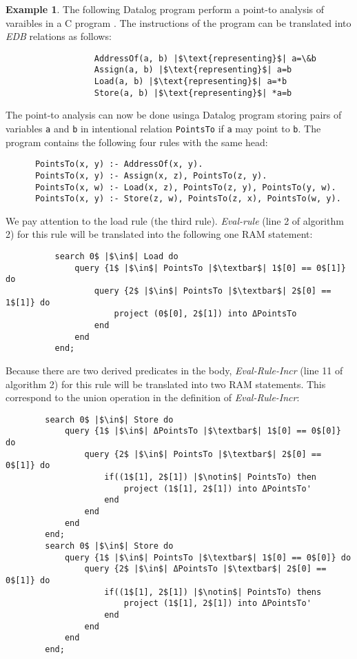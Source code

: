 \documentclass[twoside,11pt,openright]{report}
\theoremstyle{definition}
\newtheorem{exmp}{Example}[chapter]
\begin{document}
\begin{exmp}
  The following Datalog program perform a point-to analysis of varaibles in a C program \cite{PGL-014}.
  The instructions of the program can be translated into \textit{EDB} relations as follows:
  \begin{verbatim}
                  AddressOf(a, b) |$\text{representing}$| a=\&b
                  Assign(a, b) |$\text{representing}$| a=b
                  Load(a, b) |$\text{representing}$| a=*b
                  Store(a, b) |$\text{representing}$| *a=b
  \end{verbatim}
  The point-to analysis can now be done usinga Datalog program storing pairs of variables \texttt{a} and
  \texttt{b} in intentional relation \texttt{PointsTo} if \texttt{a} may point to \texttt{b}.
  The program contains the following four rules with the same head:
  \begin{verbatim}
      PointsTo(x, y) :- AddressOf(x, y).
      PointsTo(x, y) :- Assign(x, z), PointsTo(z, y).
      PointsTo(x, w) :- Load(x, z), PointsTo(z, y), PointsTo(y, w).
      PointsTo(x, y) :- Store(z, w), PointsTo(z, x), PointsTo(w, y).
  \end{verbatim}
  We pay attention to the load rule (the third rule). \textit{Eval-rule} (line 2 of algorithm 2)
  for this rule will be translated into the following one RAM statement:
  \begin{verbatim}
          search 0$ |$\in$| Load do
              query {1$ |$\in$| PointsTo |$\textbar$| 1$[0] == 0$[1]} do
                  query {2$ |$\in$| PointsTo |$\textbar$| 2$[0] == 1$[1]} do
                      project (0$[0], 2$[1]) into ΔPointsTo
                  end
              end
          end;
  \end{verbatim}
  Because there are two derived predicates in the body,
  \textit{Eval-Rule-Incr} (line 11 of algorithm 2) for this rule will be translated into two RAM statements.
  This correspond to the union operation in the definition of \textit{Eval-Rule-Incr}:
  \begin{verbatim}
        search 0$ |$\in$| Store do
            query {1$ |$\in$| ΔPointsTo |$\textbar$| 1$[0] == 0$[0]} do
                query {2$ |$\in$| PointsTo |$\textbar$| 2$[0] == 0$[1]} do
                    if((1$[1], 2$[1]) |$\notin$| PointsTo) then
                        project (1$[1], 2$[1]) into ΔPointsTo'
                    end
                end
            end
        end;
        search 0$ |$\in$| Store do
            query {1$ |$\in$| PointsTo |$\textbar$| 1$[0] == 0$[0]} do
                query {2$ |$\in$| ΔPointsTo |$\textbar$| 2$[0] == 0$[1]} do
                    if((1$[1], 2$[1]) |$\notin$| PointsTo) thens
                        project (1$[1], 2$[1]) into ΔPointsTo'
                    end
                end
            end
        end;
  \end{verbatim}
\end{exmp}
\label{exmp:point-to}
\end{document}
